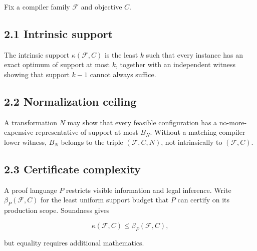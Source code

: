 \documentclass[
  11pt,
]{article}
\begin{document}
Fix a compiler family \(\mathcal F\) and objective \(C\).

\hypertarget{intrinsic-support}{%
\subsection{2.1 Intrinsic support}\label{intrinsic-support}}

The intrinsic support \(\kappa(\mathcal F, C)\) is the least \(k\) such
that every instance has an exact optimum of support at most \(k\),
together with an independent witness showing that support \(k-1\) cannot
always suffice.

\hypertarget{normalization-ceiling}{%
\subsection{2.2 Normalization ceiling}\label{normalization-ceiling}}

A transformation \(N\) may show that every feasible configuration has a
no-more-expensive representative of support at most \(B_N\). Without a
matching compiler lower witness, \(B_N\) belongs to the triple
\((\mathcal F, C, N)\), not intrinsically to \((\mathcal F, C)\).

\hypertarget{certificate-complexity}{%
\subsection{2.3 Certificate complexity}\label{certificate-complexity}}

A proof language \(P\) restricts visible information and legal
inference. Write \(\beta_P(\mathcal F, C)\) for the least uniform
support budget that \(P\) can certify on its production scope. Soundness
gives

\[
\kappa(\mathcal F, C)\le \beta_P(\mathcal F, C),
\]

but equality requires additional mathematics.
\end{document}
